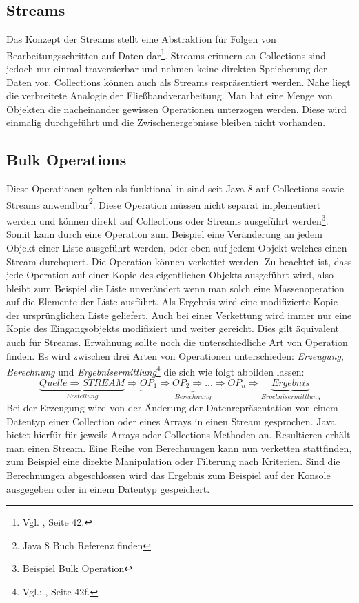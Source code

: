 \subsection{Streams}
Das Konzept der Streams stellt eine Abstraktion für Folgen von Bearbeitungsschritten auf Daten dar\footnote{Vgl. \cite{Inden.2015}, Seite 42.}. Streams erinnern an Collections sind jedoch nur einmal traversierbar und nehmen keine direkten Speicherung der Daten vor. Collections können auch als Streams respräsentiert werden. Nahe liegt die verbreitete Analogie der Fließbandverarbeitung. Man hat eine Menge von Objekten die nacheinander gewissen Operationen unterzogen werden. Diese wird einmalig durchgeführt und die Zwischenergebnisse bleiben nicht vorhanden. 
\subsection{Bulk Operations}
Diese Operationen gelten als funktional in sind seit Java 8 auf Collections sowie Streams anwendbar\footnote{Java 8 Buch Referenz finden}. Diese Operation müssen nicht separat implementiert werden und können direkt auf Collections oder Streams ausgeführt werden\footnote{Beispiel Bulk Operation}. Somit kann durch eine Operation zum Beispiel eine Veränderung an jedem Objekt einer Liste ausgeführt werden, oder eben auf jedem Objekt welches einen Stream durchquert. Die Operation können verkettet werden. Zu beachtet ist, dass jede Operation auf einer Kopie des eigentlichen Objekts ausgeführt wird, also bleibt zum Beispiel die Liste unverändert wenn man solch eine Massenoperation auf die Elemente der Liste ausführt. Als Ergebnis wird eine modifizierte Kopie der ursprünglichen Liste geliefert. Auch bei einer Verkettung wird immer nur eine Kopie des Eingangsobjekts modifiziert und weiter gereicht. Dies gilt äquivalent auch für Streams. Erwähnung sollte noch die unterschiedliche Art von Operation finden. Es wird zwischen drei Arten von Operationen unterschieden: \textit{Erzeugung}, \textit{Berechnung} und \textit{Ergebnisermittlung}\footnote{Vgl.: \cite{Inden.2015}, Seite 42f.} die sich wie folgt abbilden lassen: 
\begin{displaymath}
	\underbrace{Quelle \Rightarrow STREAM}_{Erstellung} \Rightarrow \underbrace{OP_{1} \Rightarrow OP_{2} \Rightarrow ... \Rightarrow OP_{n}}_{Berechnung} \Rightarrow \underbrace{Ergebnis}_{Ergebnisermittlung}
\end{displaymath}
Bei der Erzeugung wird von der Änderung der Datenrepräsentation von einem Datentyp einer Collection oder eines Arrays in einen Stream gesprochen. Java bietet hierfür für jeweils Arrays oder Collections Methoden an. Resultieren erhält man einen Stream. Eine Reihe von Berechnungen kann nun verketten stattfinden, zum Beispiel eine direkte Manipulation oder Filterung nach Kriterien. Sind die Berechnungen abgeschlossen wird das Ergebnis zum Beispiel auf der Konsole ausgegeben oder in einem Datentyp gespeichert.
